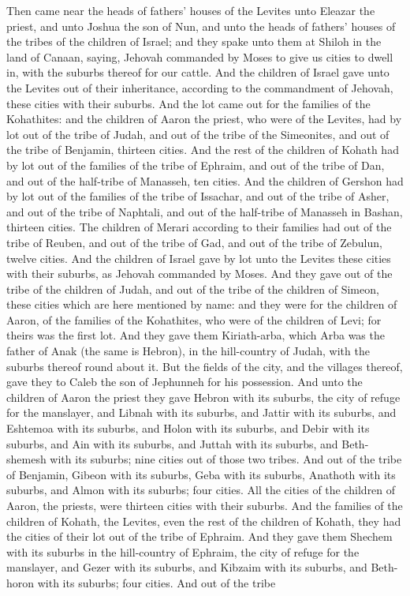 Then came near the heads of fathers’ houses of the Levites unto Eleazar the priest, and unto Joshua the son of Nun, and unto the heads of fathers’ houses of the tribes of the children of Israel; and they spake unto them at Shiloh in the land of Canaan, saying, Jehovah commanded by Moses to give us cities to dwell in, with the suburbs thereof for our cattle. And the children of Israel gave unto the Levites out of their inheritance, according to the commandment of Jehovah, these cities with their suburbs.  And the lot came out for the families of the Kohathites: and the children of Aaron the priest, who were of the Levites, had by lot out of the tribe of Judah, and out of the tribe of the Simeonites, and out of the tribe of Benjamin, thirteen cities.  And the rest of the children of Kohath had by lot out of the families of the tribe of Ephraim, and out of the tribe of Dan, and out of the half-tribe of Manasseh, ten cities.  And the children of Gershon had by lot out of the families of the tribe of Issachar, and out of the tribe of Asher, and out of the tribe of Naphtali, and out of the half-tribe of Manasseh in Bashan, thirteen cities.  The children of Merari according to their families had out of the tribe of Reuben, and out of the tribe of Gad, and out of the tribe of Zebulun, twelve cities.  And the children of Israel gave by lot unto the Levites these cities with their suburbs, as Jehovah commanded by Moses. And they gave out of the tribe of the children of Judah, and out of the tribe of the children of Simeon, these cities which are here mentioned by name: and they were for the children of Aaron, of the families of the Kohathites, who were of the children of Levi; for theirs was the first lot. And they gave them Kiriath-arba, which Arba was the father of Anak (the same is Hebron), in the hill-country of Judah, with the suburbs thereof round about it. But the fields of the city, and the villages thereof, gave they to Caleb the son of Jephunneh for his possession.  And unto the children of Aaron the priest they gave Hebron with its suburbs, the city of refuge for the manslayer, and Libnah with its suburbs, and Jattir with its suburbs, and Eshtemoa with its suburbs, and Holon with its suburbs, and Debir with its suburbs, and Ain with its suburbs, and Juttah with its suburbs, and Beth-shemesh with its suburbs; nine cities out of those two tribes. And out of the tribe of Benjamin, Gibeon with its suburbs, Geba with its suburbs, Anathoth with its suburbs, and Almon with its suburbs; four cities. All the cities of the children of Aaron, the priests, were thirteen cities with their suburbs.  And the families of the children of Kohath, the Levites, even the rest of the children of Kohath, they had the cities of their lot out of the tribe of Ephraim. And they gave them Shechem with its suburbs in the hill-country of Ephraim, the city of refuge for the manslayer, and Gezer with its suburbs, and Kibzaim with its suburbs, and Beth-horon with its suburbs; four cities. And out of the tribe 
